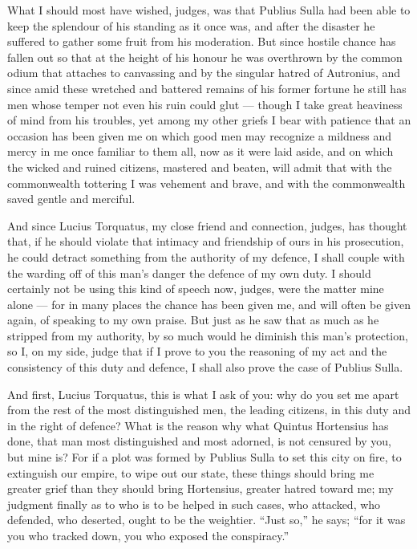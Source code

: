
 What I should most have wished, judges, was that Publius Sulla had been able to keep the splendour of his standing as it once was, and after the disaster he suffered to gather some fruit from his moderation. But since hostile chance has fallen out so that at the height of his honour he was overthrown by the common odium that attaches to canvassing and by the singular hatred of Autronius, and since amid these wretched and battered remains of his former fortune he still has men whose temper not even his ruin could glut --- though I take great heaviness of mind from his troubles, yet among my other griefs I bear with patience that an occasion has been given me on which good men may recognize a mildness and mercy in me once familiar to them all, now as it were laid aside, and on which the wicked and ruined citizens, mastered and beaten, will admit that with the commonwealth tottering I was vehement and brave, and with the commonwealth saved gentle and merciful.

 And since Lucius Torquatus, my close friend and connection, judges, has thought that, if he should violate that intimacy and friendship of ours in his prosecution, he could detract something from the authority of my defence, I shall couple with the warding off of this man's danger the defence of my own duty. I should certainly not be using this kind of speech now, judges, were the matter mine alone --- for in many places the chance has been given me, and will often be given again, of speaking to my own praise. But just as he saw that as much as he stripped from my authority, by so much would he diminish this man's protection, so I, on my side, judge that if I prove to you the reasoning of my act and the consistency of this duty and defence, I shall also prove the case of Publius Sulla.

 And first, Lucius Torquatus, this is what I ask of you: why do you set me apart from the rest of the most distinguished men, the leading citizens, in this duty and in the right of defence? What is the reason why what Quintus Hortensius has done, that man most distinguished and most adorned, is not censured by you, but mine is? For if a plot was formed by Publius Sulla to set this city on fire, to extinguish our empire, to wipe out our state, these things should bring me greater grief than they should bring Hortensius, greater hatred toward me; my judgment finally as to who is to be helped in such cases, who attacked, who defended, who deserted, ought to be the weightier. ``Just so,'' he says; ``for it was you who tracked down, you who exposed the conspiracy.''

